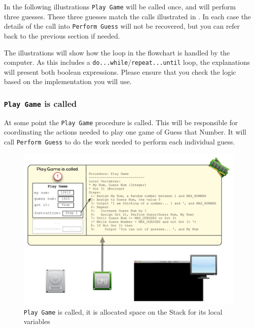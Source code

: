 In the following illustrations \texttt{Play Game} will be called once, and will perform three guesses. These three guesses match the calls illustrated in  . In each case the details of the call into \texttt{Perform Guess} will not be recovered, but you can refer back to the previous section if needed. 

The illustrations will show how the loop in the flowchart is handled by the computer. As this includes a \texttt{do...while}/\texttt{repeat...until} loop, the explanations will present both boolean expressions. Please ensure that you check the logic based on the implementation you will use.

\clearpage
\subsubsection{\texttt{Play Game} is called} %
\label{ssub:play game_is_called}

At some point the \texttt{Play Game} procedure is called. This will be responsible for coordinating the actions needed to play one game of Guess that Number. It will call \texttt{Perform Guess} to do the work needed to perform each individual guess.

\begin{figure}[htbp]
   \centering
   \includegraphics[width=\textwidth]{./topics/control-flow/images/PlayGame1} 
   \caption{\texttt{Play Game} is called, it is allocated space on the Stack for its local variables}
   \label{fig:play-game-1}
\end{figure}

